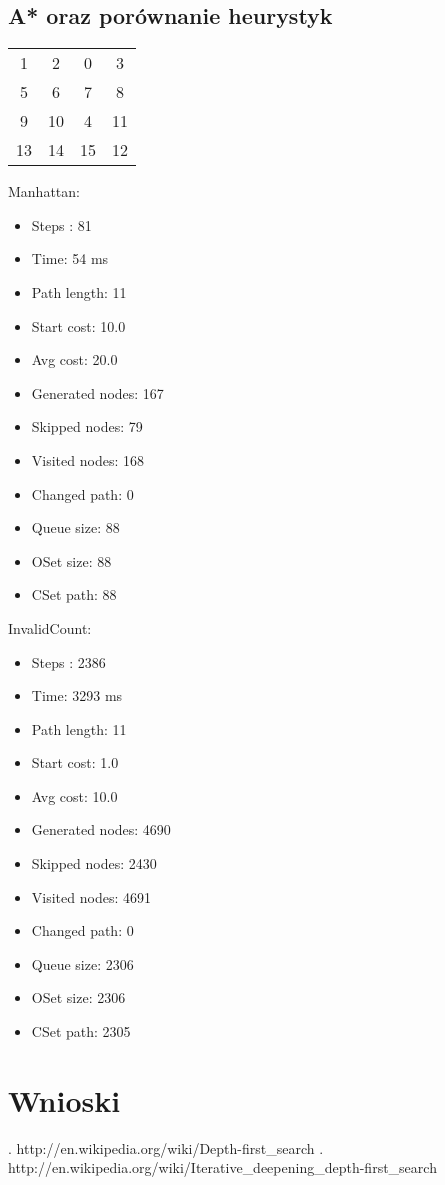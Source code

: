 \documentclass{classrep}
\begin{document}
			\subsection{A* oraz porównanie heurystyk}
				\begin{center}
					\begin{tabular}{ c c c c }
	  						1 & 2 & 0 & 3 \\
	  						5 & 6 & 7 & 8 \\
	  						9 & 10 & 4 & 11 \\
	  						13 & 14 & 15 & 12 \\
					\end{tabular}
				\end{center}
					Manhattan:
					\begin{itemize}
						\item Steps :					81
						\item Time:					54 ms
						\item Path length:			11
						\item Start cost:				10.0
						\item Avg cost:				20.0
						\item Generated nodes:		167
						\item Skipped nodes:			79
						\item Visited nodes:			168
						\item Changed path:			0
						\item Queue size:				88
						\item OSet size:				88
						\item CSet path:				88
					\end{itemize}
					InvalidCount:
					\begin{itemize}
						\item Steps :					2386
						\item Time:					3293 ms
						\item Path length:			11
						\item Start cost:				1.0
						\item Avg cost:				10.0
						\item Generated nodes:		4690
						\item Skipped nodes:			2430
						\item Visited nodes:			4691
						\item Changed path:			0
						\item Queue size:				2306
						\item OSet size:				2306
						\item CSet path:				2305
					\end{itemize}
			
	\section{Wnioski}
	
	\begin{thebibliography}{0}
	  \bibitem. http://en.wikipedia.org/wiki/Depth-first\_search
	  \bibitem. http://en.wikipedia.org/wiki/Iterative\_deepening\_depth-first\_search   
	\end{thebibliography}
\end{document}
